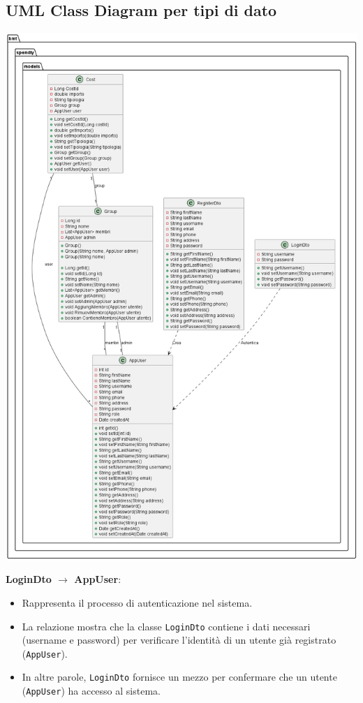 \subsection{UML Class Diagram per tipi di dato}

\begin{center}
    \includegraphics[scale=0.345]{images/ClassDiagram2.png}
\end{center}
\textbf{LoginDto $\rightarrow$ AppUser}: \begin{itemize} \item Rappresenta il processo di autenticazione nel sistema. \item La relazione mostra che la classe \texttt{LoginDto} contiene i dati necessari (username e password) per verificare l'identità di un utente già registrato (\texttt{AppUser}). \item In altre parole, \texttt{LoginDto} fornisce un mezzo per confermare che un utente (\texttt{AppUser}) ha accesso al sistema. \end{itemize}
